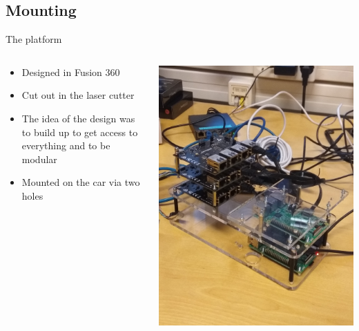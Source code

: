 \documentclass{beamer}
\begin{document}
\subsection{Mounting}
\begin{frame}{The platform}
    
    \begin{columns}
        \begin{column}{0.47\textwidth}
            \begin{itemize}
                \item  Designed in Fusion 360
                \item  Cut out in the laser cutter
                \item  The idea of the design was to build up to get access to everything and to be modular
                \item Mounted on the car via two holes 
            \end{itemize}
        \end{column}
        \begin{column}{0.5\textwidth}
            \includegraphics[width=0.7\linewidth]{platform.jpg}
            \label{fig:platform}
        \end{column}
    \end{columns}
\end{frame}
\end{document}

